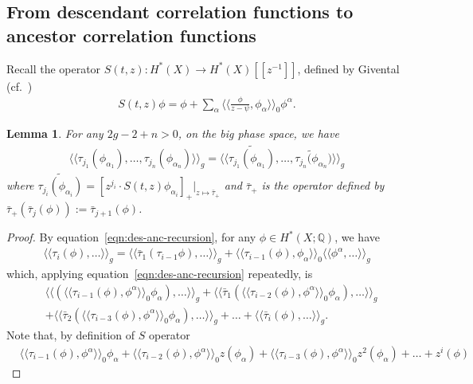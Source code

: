 \documentclass[12pt,reqno]{amsart}
\theoremstyle{plain}
\newtheorem{lemma}[theorem]{Lemma}
\theoremstyle{definition}
\theoremstyle{remark}
\begin{document}
\begin{appendix}
\subsection{From descendant correlation functions to ancestor correlation functions}\label{subsec:des-anc}
Recall the  operator $S(t,z)\colon H^*(X)\rightarrow H^*(X)[[z^{-1}]]$, defined by Givental (cf.\ \cite{givental2001semisimple})
\begin{align*}
S(t,z)\phi=\phi+\sum_{\alpha}\langle\langle \frac{\phi}{z-\psi},\phi_\alpha\rangle\rangle_0\phi^\alpha.    
\end{align*}

\begin{lemma} For any $2g-2+n>0$, on the big phase space, we have
\begin{align}\label{eqn:des-anc-corre}
\langle\langle\tau_{j_1}(\phi_{\alpha_1}),\dots,\tau_{j_n}(\phi_{\alpha_n})\rangle\rangle_g=\langle\langle\widetilde{\tau_{j_1}(\phi_{\alpha_1})},\dots,\widetilde{\tau_{j_n}(\phi_{\alpha_n}})\rangle\rangle_g  
\end{align}
where $\widetilde{\tau_{j_i}(\phi_{\alpha_i})}=[z^{j_i}\cdot S(t,z)\phi_{\alpha_i}]_{+}|_{z\mapsto \bar{\tau}_{+}}$ and $\bar{\tau}_{+}$ is the operator defined by $\bar{\tau}_{+}(\bar{\tau}_{j}(\phi)):=\bar{\tau}_{j+1}(\phi)$. 
\end{lemma}
\begin{proof}
   By equation~\eqref{eqn:des-anc-recursion}, for any $\phi\in H^*(X;\mathbb{Q})$,  we have
\begin{align*}
\langle\langle\tau_i(\phi),\dots\rangle
\rangle_g
=\langle\langle\bar\tau_1(\tau_{i-1}\phi),\dots\rangle\rangle_g
+\langle\langle\tau_{i-1}(\phi),\phi_\alpha\rangle\rangle_0\langle\langle\phi^\alpha,\dots\rangle\rangle_g
\end{align*}
which,
 applying equation~\eqref{eqn:des-anc-recursion} repeatedly, is
 \begin{align*}
 &\langle\langle(\langle\langle\tau_{i-1}(\phi),\phi^\alpha\rangle\rangle_0 \phi_\alpha),\dots\rangle\rangle_g 
 +\langle\langle\bar\tau_{1}(\langle\langle\tau_{i-2}(\phi),\phi^\alpha\rangle\rangle_0 \phi_\alpha),\dots\rangle\rangle_g
\\&+\langle\langle\bar\tau_2(\langle\langle\tau_{i-3}(\phi),\phi^\alpha\rangle\rangle_0 \phi_\alpha),\dots\rangle\rangle_g 
+\dots+\langle\langle\bar{\tau}_i(\phi),\dots\rangle\rangle_g.
\end{align*}
Note that, by definition of $S$ operator
\begin{align*}
& \langle\langle\tau_{i-1}(\phi),\phi^\alpha\rangle\rangle_0 \phi_\alpha+\langle\langle\tau_{i-2}(\phi),\phi^\alpha\rangle\rangle_0 z(\phi_\alpha)+\langle\langle\tau_{i-3}(\phi),\phi^\alpha\rangle\rangle_0 z^2(\phi_\alpha)+\dots +z^i(\phi)  

\end{align*}
\end{proof}
\end{appendix}
\end{document}
